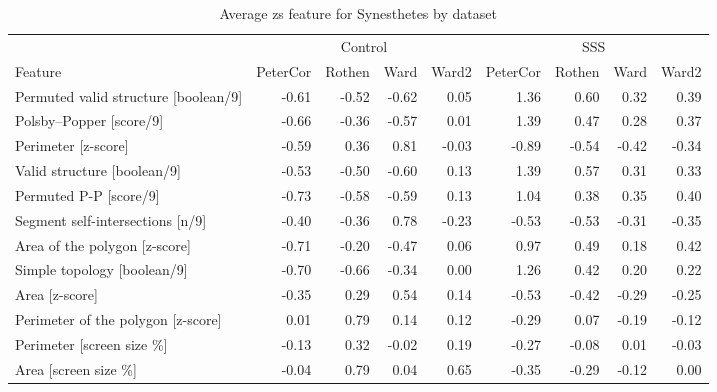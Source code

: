 \documentclass[
  man,
  floatsintext,
  longtable,
  a4paper,
  nolmodern,
  notxfonts,
  notimes,
  colorlinks=true,linkcolor=blue,citecolor=blue,urlcolor=blue]{apa7}
\begin{document}
\begin{table}

{\caption{{Average zs feature for Synesthetes by
dataset}{\label{tbl-apx02b}}}
\vspace{-20pt}}

\fontsize{12.0pt}{14.0pt}\selectfont
\begin{tabular*}{\linewidth}{@{\extracolsep{\fill}}>{\raggedright\arraybackslash}p{\dimexpr 112.50pt -2\tabcolsep-1.5\arrayrulewidth}rrrrrrrr}
\toprule
 & \multicolumn{4}{c}{{Control}} & \multicolumn{4}{c}{{SSS}} \\ 
\cmidrule(lr){2-5} \cmidrule(lr){6-9}
Feature & PeterCor & Rothen & Ward & Ward2 & PeterCor & Rothen & Ward & Ward2 \\ 
\midrule\addlinespace[2.5pt]
Permuted valid structure [boolean/9] & -0.61 & -0.52 & -0.62 &  0.05 &  1.36 &  0.60 &  0.32 &  0.39 \\ 
Polsby–Popper [score/9] & -0.66 & -0.36 & -0.57 &  0.01 &  1.39 &  0.47 &  0.28 &  0.37 \\ 
Perimeter [z-score] & -0.59 &  0.36 &  0.81 & -0.03 & -0.89 & -0.54 & -0.42 & -0.34 \\ 
Valid structure [boolean/9] & -0.53 & -0.50 & -0.60 &  0.13 &  1.39 &  0.57 &  0.31 &  0.33 \\ 
Permuted P-P [score/9] & -0.73 & -0.58 & -0.59 &  0.13 &  1.04 &  0.38 &  0.35 &  0.40 \\ 
Segment self-intersections [n/9] & -0.40 & -0.36 &  0.78 & -0.23 & -0.53 & -0.53 & -0.31 & -0.35 \\ 
Area of the polygon [z-score] & -0.71 & -0.20 & -0.47 &  0.06 &  0.97 &  0.49 &  0.18 &  0.42 \\ 
Simple topology [boolean/9] & -0.70 & -0.66 & -0.34 &  0.00 &  1.26 &  0.42 &  0.20 &  0.22 \\ 
Area [z-score] & -0.35 &  0.29 &  0.54 &  0.14 & -0.53 & -0.42 & -0.29 & -0.25 \\ 
Perimeter of the polygon [z-score] &  0.01 &  0.79 &  0.14 &  0.12 & -0.29 &  0.07 & -0.19 & -0.12 \\ 
Perimeter [screen size \%] & -0.13 &  0.32 & -0.02 &  0.19 & -0.27 & -0.08 &  0.01 & -0.03 \\ 
Area [screen size \%] & -0.04 &  0.79 &  0.04 &  0.65 & -0.35 & -0.29 & -0.12 &  0.00 \\ 
\bottomrule
\end{tabular*}

\end{table}
\end{document}
